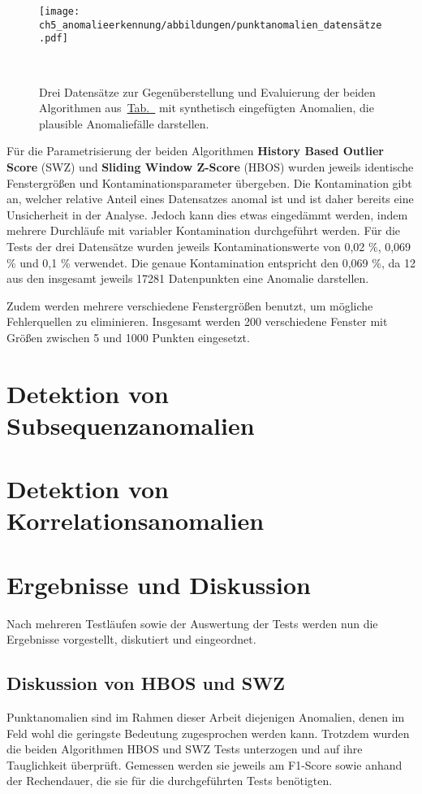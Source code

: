 \begin{figure}[t!]
    \centering
        \texttt{[image: ch5\_anomalieerkennung/abbildungen/punktanomalien\_datensätze.pdf]}
    \caption{\centering Drei Datensätze zur Gegenüberstellung und Evaluierung der beiden Algorithmen
    aus~\hyperref[tab:algorithmen]{Tab.~} mit synthetisch eingefügten Anomalien, die plausible Anomaliefälle darstellen.}
~\label{fig:punktanomalien_testdata}
\end{figure}

Für die Parametrisierung der beiden Algorithmen \textbf{History Based Outlier Score} (SWZ) und \textbf{Sliding Window Z-Score} (HBOS) wurden jeweils
identische Fenstergrößen und Kontaminationsparameter übergeben. Die Kontamination gibt an, welcher relative Anteil eines Datensatzes anomal
ist und ist daher bereits eine Unsicherheit in der Analyse. Jedoch kann dies etwas eingedämmt werden, indem mehrere Durchläufe mit variabler
Kontamination durchgeführt werden. Für die Tests der drei Datensätze wurden jeweils Kontaminationswerte von 0,02 \%, 0,069 \% und 0,1 \%
verwendet. Die genaue Kontamination entspricht den 0,069 \%, da 12 aus den insgesamt jeweils 17281 Datenpunkten eine Anomalie darstellen.

Zudem werden mehrere verschiedene Fenstergrößen benutzt, um mögliche Fehlerquellen zu eliminieren. Insgesamt werden 200 verschiedene Fenster
mit Größen zwischen 5 und 1000 Punkten eingesetzt.

\section{Detektion von Subsequenzanomalien}

\section{Detektion von Korrelationsanomalien}

\section{Ergebnisse und Diskussion}
Nach mehreren Testläufen sowie der Auswertung der Tests werden nun die Ergebnisse vorgestellt, diskutiert und eingeordnet.

\subsection{Diskussion von HBOS und SWZ}
Punktanomalien sind im Rahmen dieser Arbeit diejenigen Anomalien, denen im Feld wohl die geringste Bedeutung zugesprochen werden kann.
Trotzdem wurden die beiden Algorithmen HBOS und SWZ Tests unterzogen und auf ihre Tauglichkeit überprüft. Gemessen werden sie jeweils am
F1-Score sowie anhand der Rechendauer, die sie für die durchgeführten Tests benötigten.

